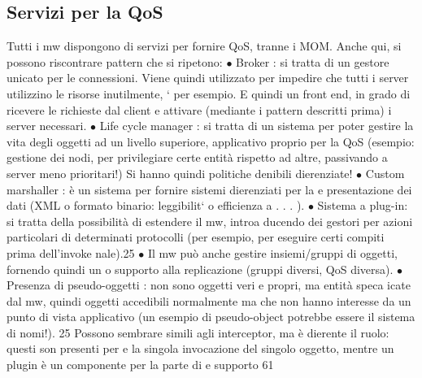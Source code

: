 \subsection{Servizi per la QoS}
Tutti i mw dispongono di servizi per fornire QoS, tranne i MOM. Anche qui, si
possono riscontrare pattern che si ripetono:
$\bullet$ Broker : si tratta di un gestore unicato per le connessioni. Viene quindi
utilizzato per impedire che tutti i server utilizzino le risorse inutilmente,
`
per esempio. E quindi un front end, in grado di ricevere le richieste dal
client e attivare (mediante i pattern descritti prima) i server necessari.
$\bullet$ Life cycle manager : si tratta di un sistema per poter gestire la vita degli
oggetti ad un livello superiore, applicativo proprio per la QoS (esempio:
gestione dei nodi, per privilegiare certe entità rispetto ad altre, passivando
a
server meno prioritari!) Si hanno quindi politiche denibili dierenziate!
$\bullet$ Custom marshaller : è un sistema per fornire sistemi dierenziati per la
e
presentazione dei dati (XML o formato binario: leggibilit` o efficienza
a
. . . ).
$\bullet$ Sistema a plug-in: si tratta della possibilità di estendere il mw, introa
ducendo dei gestori per azioni particolari di determinati protocolli (per
esempio, per eseguire certi compiti prima dell'invoke nale).25
$\bullet$ Il mw può anche gestire insiemi/gruppi di oggetti, fornendo quindi un
o
supporto alla replicazione (gruppi diversi, QoS diversa).
$\bullet$ Presenza di pseudo-oggetti : non sono oggetti veri e propri, ma entità speca
icate dal mw, quindi oggetti accedibili normalmente ma che non hanno
interesse da un punto di vista applicativo (un esempio di pseudo-object
potrebbe essere il sistema di nomi!).
25 Possono sembrare simili agli interceptor, ma è dierente il ruolo: questi son presenti per
e
la singola invocazione del singolo oggetto, mentre un plugin è un componente per la parte di
e
supporto
61